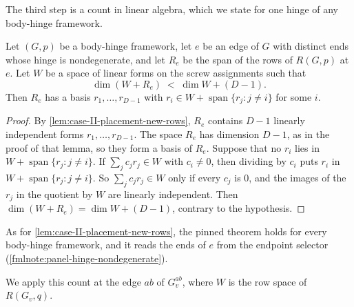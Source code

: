 The third step is a count in linear algebra, which we state for one
hinge of any body-hinge framework.

\begin{lemma}
  \label{lem:case-III-claim-6-11-redundant-row}
  \leanok
  Let $(G, p)$ be a body-hinge framework, let $e$ be an edge of $G$ with
  distinct ends whose hinge is nondegenerate, and let $R_e$ be the span
  of the rows of $R(G, p)$ at $e$. Let $W$ be a space of linear forms on
  the screw assignments such that
  \[
    \dim (W + R_e) \;<\; \dim W + (D - 1).
  \]
  Then $R_e$ has a basis $r_1, \dots, r_{D-1}$ with
  $r_i \in W + \operatorname{span}\{r_j : j \neq i\}$ for some $i$.
\end{lemma}
\begin{proof}
  \leanok
  By \cref{lem:case-II-placement-new-rows}, $R_e$ contains $D - 1$
  linearly independent forms $r_1, \dots, r_{D-1}$. The space $R_e$ has
  dimension $D - 1$, as in the proof of that lemma, so they form a basis
  of $R_e$. Suppose that no $r_i$ lies in
  $W + \operatorname{span}\{r_j : j \neq i\}$. If
  $\sum_j c_j r_j \in W$ with $c_i \neq 0$, then dividing by $c_i$
  puts $r_i$ in $W + \operatorname{span}\{r_j : j \neq i\}$. So
  $\sum_j c_j r_j \in W$ only if every $c_j$ is $0$, and the images of
  the $r_j$ in the quotient by $W$ are linearly independent. Then
  $\dim (W + R_e) = \dim W + (D - 1)$, contrary to the hypothesis.
\end{proof}

\begin{fmlnote}
  As for \cref{lem:case-II-placement-new-rows}, the pinned theorem holds
  for every body-hinge framework, and it reads the ends of $e$ from the
  endpoint selector (\cref{fmlnote:panel-hinge-nondegenerate}).
\end{fmlnote}

We apply this count at the edge $ab$ of $G_v^{ab}$, where $W$ is the row
space of $R(G_v, q)$.

